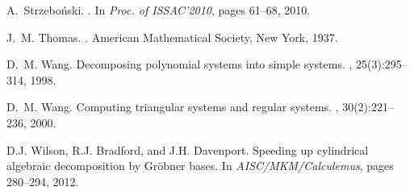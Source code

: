 \documentclass[10pt]{article}
\begin{document}
\begin{thebibliography}{10}
A.~Strzebo\'nski.
.
\newblock In {\em Proc. of ISSAC'2010}, pages 61--68, 2010.

J.~M. Thomas.
.
\newblock American Mathematical Society, New York, 1937.

D.~M. Wang.
\newblock Decomposing polynomial systems into simple systems.
, 25(3):295--314, 1998.

D.~M. Wang.
\newblock Computing triangular systems and regular systems.
, 30(2):221--236, 2000.

D.J. Wilson, R.J. Bradford, and J.H. Davenport.
\newblock Speeding up cylindrical algebraic decomposition by {Gr{\"o}bner}
  bases.
\newblock In {\em AISC/MKM/Calculemus}, pages 280--294, 2012.

\end{thebibliography}
\end{document}
